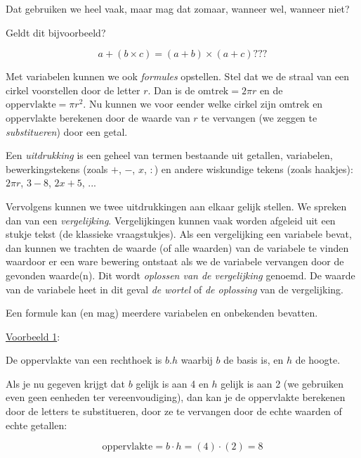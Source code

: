 Dat gebruiken we heel vaak, maar mag dat zomaar, wanneer wel, wanneer
niet?

Geldt dit bijvoorbeeld?

\begin{equation*}
a + (b \times{} c) = (a + b) \times{} (a + c) ???
\end{equation*}

\medskip{}


\noindent Met variabelen kunnen we ook \emph{formules} opstellen.
Stel dat we de straal van een cirkel voorstellen door de letter $r$.
Dan is de $\mathrm{omtrek}=2\pi r$ en de $\mathrm{oppervlakte}=\pi r^{2}$.
Nu kunnen we voor eender welke cirkel zijn omtrek en oppervlakte berekenen
door de waarde van $r$ te vervangen (we zeggen te \emph{substitueren})
door een getal.

\medskip{}


\noindent Een \emph{uitdrukking} is een geheel van termen bestaande
uit getallen, variabelen, bewerkingstekens (zoals $+$, $-$, $x$, $:$) en andere
wiskundige tekens (zoals haakjes): $2\pi r$, $3-8$, $2x+5$, ...

\noindent Vervolgens kunnen we twee uitdrukkingen aan elkaar gelijk
stellen. We spreken dan van een \emph{vergelijking}. Vergelijkingen
kunnen vaak worden afgeleid uit een stukje tekst (de klassieke vraagstukjes).
Als een vergelijking een variabele bevat, dan kunnen we trachten de
waarde (of alle waarden) van de variabele te vinden waardoor er een
ware bewering ontstaat als we de variabele vervangen door de gevonden
waarde(n). Dit wordt \emph{oplossen van de vergelijking} genoemd.
De waarde van de variabele heet in dit geval \emph{de wortel} of \emph{de
oplossing} van de vergelijking.

\noindent Een formule kan (en mag) meerdere variabelen en onbekenden
bevatten. \medskip{}


\uline{Voorbeeld 1}:

De oppervlakte van een rechthoek is $b.h$ waarbij $b$ de basis is,
en $h$ de hoogte.

Als je nu gegeven krijgt dat $b$ gelijk is aan 4 en $h$ gelijk is
aan 2 (we gebruiken even geen eenheden ter vereenvoudiging), dan kan
je de oppervlakte berekenen door de letters te substitueren, door
ze te vervangen door de echte waarden of echte getallen:

\begin{equation*}
\mathrm{oppervlakte}=b\cdot h=(4)\cdot(2)=8
\end{equation*}

